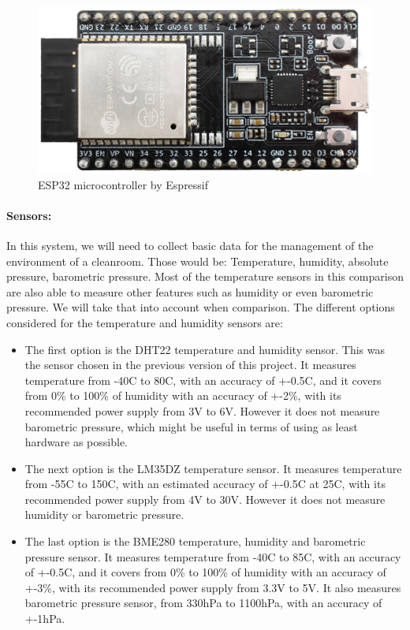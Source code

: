 \documentclass[12pt]{article}
\begin{document}
\begin{figure}[h]
\label{fig:esp32}
\includegraphics[scale=0.06]{esp32-devkitc-v4-front}
\centering
\caption{ESP32 microcontroller by Espressif}
\end{figure}

\paragraph*{Sensors:}
In this system, we will need to collect basic data for the management of the environment of a cleanroom. Those would be: Temperature, humidity, absolute pressure, barometric pressure. Most of the temperature sensors in this comparison are also able to measure other features such as humidity or even barometric pressure. We will take that into account when comparison. The different options considered for the temperature and humidity sensors are:

\begin{itemize}
    \item The first option is the DHT22 temperature and humidity sensor. This was the sensor chosen in the previous version of this project. It measures temperature from -40C to 80C, with an accuracy of +-0.5C, and it covers from 0\% to 100\% of humidity with an accuracy of +-2\%, with its recommended power supply from 3V to 6V. However it does not measure barometric pressure, which might be useful in terms of using as least hardware as possible.
    \item The next option is the LM35DZ temperature sensor. It measures temperature from -55C to 150C, with an estimated accuracy of +-0.5C at 25C, with its recommended power supply from 4V to 30V. However it does not measure humidity or barometric pressure.
    \item The last option is the BME280 temperature, humidity and barometric pressure sensor. It measures temperature from -40C to 85C, with an accuracy of +-0.5C, and it covers from 0\% to 100\% of humidity with an accuracy of +-3\%, with its recommended power supply from 3.3V to 5V. It also measures barometric pressure sensor, from 330hPa to 1100hPa, with an accuracy of +-1hPa.
\end{itemize}
\end{document}
